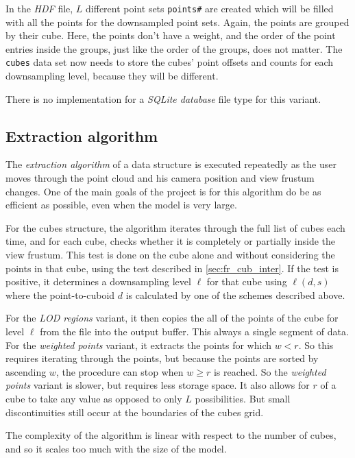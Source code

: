 \documentclass[a4paper,10pt,abstracton,notitlepage]{scrreprt}
\begin{document}
In the \emph{HDF} file, $L$ different point sets \texttt{points\#} are created which will be filled with all the points for the downsampled point sets. Again, the points are grouped by their cube. Here, the points don't have a weight, and the order of the point entries inside the groups, just like the order of the groups, does not matter. The \texttt{cubes} data set now needs to store the cubes' point offsets and counts for each downsampling level, because they will be different.

There is no implementation for a \emph{SQLite database} file type for this variant.


\subsection{Extraction algorithm}
The \emph{extraction algorithm} of a data structure is executed repeatedly as the user moves through the point cloud and his camera position and view frustum changes. One of the main goals of the project is for this algorithm do be as efficient as possible, even when the model is very large.

For the cubes structure, the algorithm iterates through the full list of cubes each time, and for each cube, checks whether it is completely or partially inside the view frustum. This test is done on the cube alone and without considering the points in that cube, using the test described in \ref{sec:fr_cub_inter}. If the test is positive, it determines a downsampling level $\ell$ for that cube using $\ell(d, s)$ where the point-to-cuboid $d$ is calculated by one of the schemes described above.

For the \emph{LOD regions} variant, it then copies the all of the points of the cube for level $\ell$ from the file into the output buffer. This always a single segment of data. For the \emph{weighted points} variant, it extracts the points for which $w < r$. So this requires iterating through the points, but because the points are sorted by ascending $w$, the procedure can stop when $w \geq r$ is reached. So the \emph{weighted points} variant is slower, but requires less storage space. It also allows for $r$ of a cube to take any value as opposed to only $L$ possibilities. But small discontinuities still occur at the boundaries of the cubes grid.

The complexity of the algorithm is linear with respect to the number of cubes, and so it scales too much with the size of the model.

\pagebreak
\end{document}
